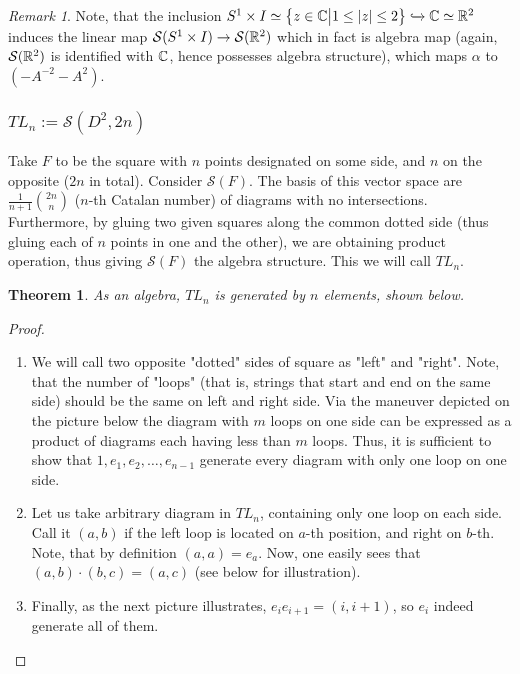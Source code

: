 \documentclass[10pt]{article} %
\newtheorem{theorem}{Theorem}
\theoremstyle{remark}
\newtheorem{remark}{Remark}
\renewcommand{\S}{\mathcal{S}}
\begin{document}
\begin{remark}Note, that the inclusion $S^1\times I\simeq\left\{z\in\mathbb{C}\big| 1\leq\left|z\right|\leq2\right\}\xhookrightarrow{}\mathbb{C}\simeq\mathbb{R}^2$ induces the linear
map $\S(S^1\times I)\to\S(\R^2)$ which in fact is algebra map (again, $\S(\R^2)$ is identified with $\mathbb{C}$, hence possesses algebra structure),
which maps $\alpha$ to $(-A^{-2}-A^2)$.
\end{remark}
\subsubsection{$TL_n:=\S(D^2,2n)$}
Take $F$ to be the square with $n$ points designated on some side, and $n$ on the opposite ($2n$ in total). Consider $\S(F)$. The basis 
of this vector space are $\frac{1}{n+1}\binom{2n}{n}$ ($n$-th Catalan number) of diagrams with no intersections. Furthermore, by
gluing two given squares along the common dotted side (thus gluing each of $n$ points in one and the other), we are obtaining product operation,
thus giving $\S(F)$ the algebra structure. This we will call $TL_n$.
\begin{theorem}As an algebra, $TL_n$ is generated by $n$ elements, shown below.
\end{theorem}
\begin{proof}
	\begin{enumerate}[1$^\circ$]
		\item We will call two opposite "dotted" sides of square as "left" and "right". Note, that the number of "loops" (that is, 
			strings that start and end on the same side) should be the same on left and right side. Via the maneuver depicted on the
			picture below
			the diagram with $m$ loops on one side can be expressed as a product of diagrams each having less than $m$ loops. Thus,
			it is sufficient to show that $1,e_1,e_2,\hdots,e_{n-1}$ generate every diagram with only one loop on one side.
		\item Let us take arbitrary diagram in $TL_n$, containing only one loop on each side. Call it $(a,b)$ if the left loop is
			located on $a$-th position, and right on $b$-th. Note, that by definition $(a,a)=e_a$. Now, one easily sees that
			$(a,b)\cdot(b,c)=(a,c)$ (see below for illustration).
		\item Finally, as the next picture illustrates, $e_ie_{i+1}=(i,i+1)$, so $e_i$ indeed generate all of them.
	\end{enumerate}
\end{proof}
\end{document}

